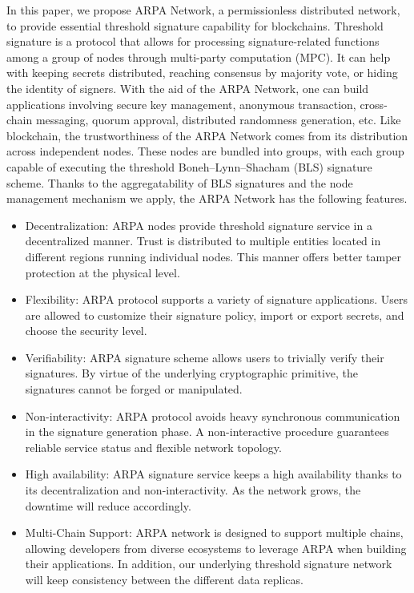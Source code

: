 \documentclass[11pt]{article}
\begin{document}
In this paper, we propose ARPA Network, a permissionless distributed network, to provide essential threshold signature capability for blockchains. Threshold signature is a protocol that allows for processing signature-related functions among a group of nodes through multi-party computation (MPC). It can help with keeping secrets distributed, reaching consensus by majority vote, or hiding the identity of signers. With the aid of the ARPA Network, one can build applications involving secure key management, anonymous transaction, cross-chain messaging, quorum approval, distributed randomness generation, etc. Like blockchain, the trustworthiness of the ARPA Network comes from its distribution across independent nodes. These nodes are bundled into groups, with each group capable of executing the threshold Boneh–Lynn–Shacham (BLS) signature scheme. Thanks to the aggregatability of BLS signatures and the node management mechanism we apply, the ARPA Network has the following features.
\begin{itemize}
    \item Decentralization: ARPA nodes provide threshold signature service in a decentralized manner. Trust is distributed to multiple entities located in different regions running individual nodes. This manner offers better tamper protection at the physical level.
    \item Flexibility: ARPA protocol supports a variety of signature applications. Users are allowed to customize their signature policy, import or export secrets, and choose the security level.
    \item Verifiability: ARPA signature scheme allows users to trivially verify their signatures. By virtue of the underlying cryptographic primitive, the signatures cannot be forged or manipulated.
    \item Non-interactivity: ARPA protocol avoids heavy synchronous communication in the signature generation phase. A non-interactive procedure guarantees reliable service status and flexible network topology.
    \item High availability: ARPA signature service keeps a high availability thanks to its decentralization and non-interactivity. As the network grows, the downtime will reduce accordingly.
    \item Multi-Chain Support: ARPA network is designed to support multiple chains, allowing developers from diverse ecosystems to leverage ARPA when building their applications. In addition, our underlying threshold signature network will keep consistency between the different data replicas.
\end{itemize}
\end{document}
